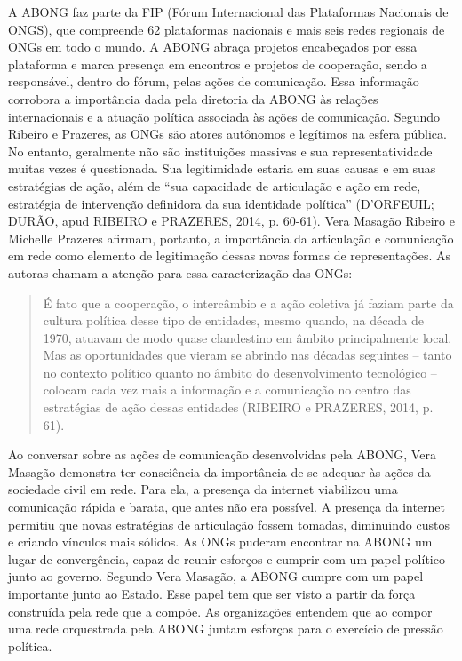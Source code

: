 A ABONG faz parte da FIP (Fórum Internacional das Plataformas Nacionais
de ONGS), que compreende 62 plataformas nacionais e mais seis redes
regionais de ONGs em todo o mundo. A ABONG abraça projetos encabeçados
por essa plataforma e marca presença em encontros e projetos de
cooperação, sendo a responsável, dentro do fórum, pelas ações de
comunicação. Essa informação corrobora a importância dada pela diretoria
da ABONG às relações internacionais e a atuação política associada às
ações de comunicação. Segundo Ribeiro e Prazeres, as ONGs são atores
autônomos e legítimos na esfera pública. No entanto, geralmente não são
instituições massivas e sua representatividade muitas vezes é
questionada. Sua legitimidade estaria em suas causas e em suas
estratégias de ação, além de ``sua capacidade de articulação e ação em
rede, estratégia de intervenção definidora da sua identidade política''
(D'ORFEUIL; DURÃO, apud RIBEIRO e PRAZERES, 2014, p. 60-61). Vera
Masagão Ribeiro e Michelle Prazeres afirmam, portanto, a importância da
articulação e comunicação em rede como elemento de legitimação dessas
novas formas de representações. As autoras chamam a atenção para essa
caracterização das ONGs:

\begin{quote}
É fato que a cooperação, o intercâmbio e a ação coletiva já faziam parte
da cultura política desse tipo de entidades, mesmo quando, na década de
1970, atuavam de modo quase clandestino em âmbito principalmente local.
Mas as oportunidades que vieram se abrindo nas décadas seguintes --
tanto no contexto político quanto no âmbito do desenvolvimento
tecnológico -- colocam cada vez mais a informação e a comunicação no
centro das estratégias de ação dessas entidades (RIBEIRO e PRAZERES,
2014, p. 61).
\end{quote}

Ao conversar sobre as ações de comunicação desenvolvidas pela ABONG,
Vera Masagão demonstra ter consciência da importância de se adequar às
ações da sociedade civil em rede. Para ela, a presença da internet
viabilizou uma comunicação rápida e barata, que antes não era possível.
A presença da internet permitiu que novas estratégias de articulação
fossem tomadas, diminuindo custos e criando vínculos mais sólidos. As
ONGs puderam encontrar na ABONG um lugar de convergência, capaz de
reunir esforços e cumprir com um papel político junto ao governo.
Segundo Vera Masagão, a ABONG cumpre com um papel importante junto ao
Estado. Esse papel tem que ser visto a partir da força construída pela
rede que a compõe. As organizações entendem que ao compor uma rede
orquestrada pela ABONG juntam esforços para o exercício de pressão
política.

